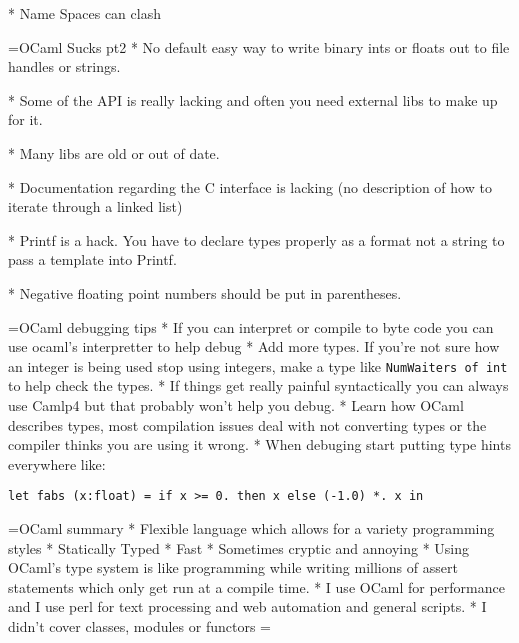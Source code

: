\documentclass[titlepage,usenames,a4,landscape,semhelv]{seminar}
\begin{document}
\begin{slide}
* Name Spaces can clash

=OCaml Sucks pt2
* No default easy way to write binary ints or floats out to file handles or strings. 

* Some of the API is really lacking and often you need external libs to make up for it.

* Many libs are old or out of date.

* Documentation regarding the C interface is lacking (no description of how to iterate through a linked list)

* Printf is a hack. You have to declare types properly as a format not
a string to pass a template into Printf.

* Negative floating point numbers should be put in parentheses.

=OCaml debugging tips
* If you can interpret or compile to byte code you can use ocaml's interpretter to help debug
* Add more types. If you're not sure how an integer is being used stop using integers, make a type like \texttt{NumWaiters of int} to help check the types.
* If things get really painful syntactically you can always use Camlp4 but that probably won't help you debug.
* Learn how OCaml describes types, most compilation issues deal with not converting types or the compiler thinks you are using it wrong.
* When debuging start putting type hints everywhere like:
\begin{verbatim}
let fabs (x:float) = if x >= 0. then x else (-1.0) *. x in
\end{verbatim}


=OCaml summary
* Flexible language which allows for a variety programming styles
* Statically Typed
* Fast
* Sometimes cryptic and annoying
* Using OCaml's type system is like programming while writing millions of assert statements which only get run at a compile time.
* I use OCaml for performance and I use perl for text processing and web automation and general scripts.
* I didn't cover classes, modules or functors
=


\end{slide}
\end{document}
